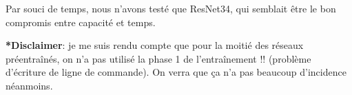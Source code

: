 Par souci de temps, nous n'avons testé que ResNet34, qui semblait être le bon compromis entre capacité et temps.

\textbf{*Disclaimer}: je me suis rendu compte que pour la moitié des réseaux préentraînés, on n'a pas utilisé la phase 1 de l'entraînement !! (problème d'écriture de ligne de commande).
On verra que ça n'a pas beaucoup d'incidence néanmoins.